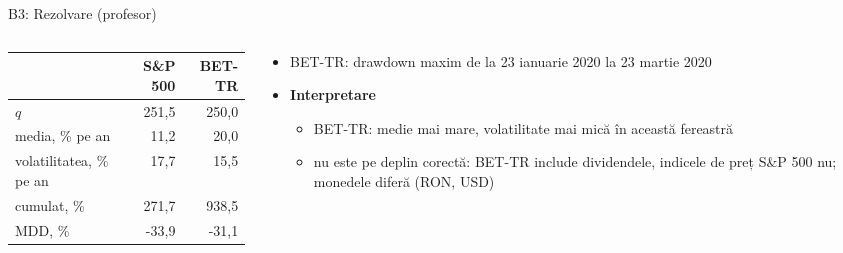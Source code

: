 \ifsolutions
\begin{frame}{B3: Rezolvare (profesor)}
\itemsize{\small}
\begin{columns}[T]
\begin{column}{0.45\textwidth}
\begin{center}
\footnotesize
\begin{tabular}{lrr}
\toprule
& S\&P 500 & BET-TR \\
\midrule
$q$ & 251{,}5 & 250{,}0 \\
media, \% pe an & 11{,}2 & 20{,}0 \\
volatilitatea, \% pe an & 17{,}7 & 15{,}5 \\
cumulat, \% & 271{,}7 & 938{,}5 \\
MDD, \% & -33{,}9 & -31{,}1 \\
\bottomrule
\end{tabular}
\end{center}

\end{column}
\begin{column}{0.52\textwidth}
\begin{itemize}
    \item BET-TR: drawdown maxim de la 23 ianuarie 2020 la 23 martie 2020
    \item \textbf{Interpretare}
    \begin{itemize}
        \item BET-TR: medie mai mare, volatilitate mai mică în această fereastră
        \item nu este pe deplin corectă: BET-TR include dividendele, indicele de preț S\&P 500 nu; monedele diferă (RON, USD)
    \end{itemize}
\end{itemize}
\end{column}
\end{columns}
\end{frame}
\fi

